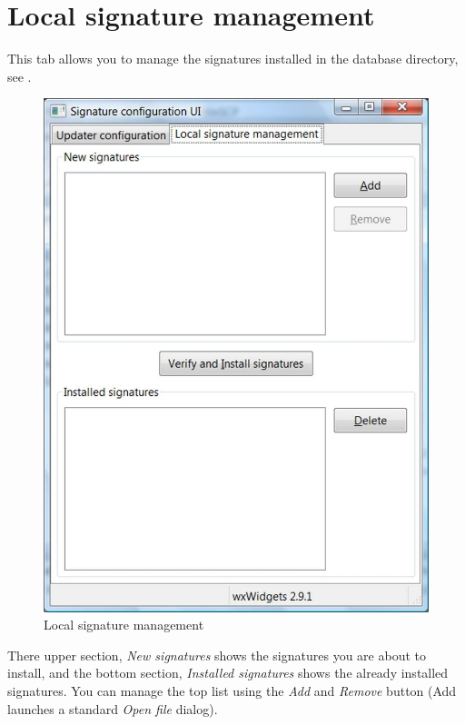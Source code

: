 \section{Local signature management}
This tab allows you to manage the signatures installed in the database directory, see .

\begin{figure}
\centering
\includegraphics{sigui_tab2.jpg}
\caption{Local signature management}
\label{fig:tab2}
\end{figure}

There upper section, \emph{New signatures} shows the signatures you are about to install,
and the bottom section, \emph{Installed signatures} shows the already installed signatures.
You can manage the top list using the \emph{Add} and \emph{Remove} button (Add launches a standard \emph{Open file} dialog).

